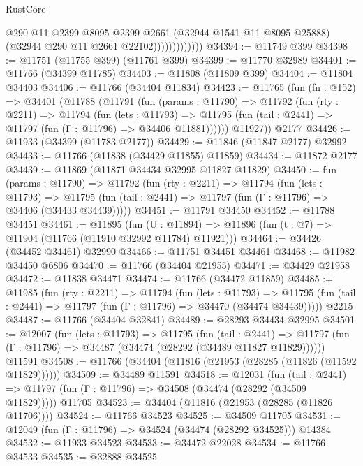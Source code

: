 \begin{lexlean}{RustCore}
\begin{coremodule}
                            @290
                            @11
                            @2399
                            @8095
                            @2399
                            @2661
                            (@32944 @1541 @11 @8095 @25888)
                            (@32944 @290 @11 @2661 @22102)))))))))))))
@34394 := @11749 @399
@34398 := @11751 (@11755 @399) (@11761 @399)
@34399 := @11770 @32989
@34401 := @11766 (@34399 @11785)
@34403 := @11808 (@11809 @399)
@34404 := @11804 @34403
@34406 := @11766 (@34404 @11834)
@34423 := @11765
    (fun (fn : @152) =>
    @34401
      (@11788
        (@11791
          (fun (params : @11790) =>
          @11792
            (fun (rty : @2211) =>
            @11794
              (fun (lets : @11793) =>
              @11795 (fun (tail : @2441) => @11797 (fun (Γ : @11796) => @34406 @11881))))))
        @11927))
    @2177
@34426 := @11933 (@34399 (@11783 @2177))
@34429 := @11846 (@11847 @2177) @32992
@34433 := @11766 (@11838 (@34429 @11855) @11859)
@34434 := @11872 @2177
@34439 := @11869 (@11871 @34434 @32995 @11827 @11829)
@34450 := fun (params : @11790) =>
  @11792
    (fun (rty : @2211) =>
    @11794
      (fun (lets : @11793) =>
      @11795 (fun (tail : @2441) => @11797 (fun (Γ : @11796) => @34406 (@34433 @34439)))))
@34451 := @11791 @34450
@34452 := @11788 @34451
@34461 := @11895
    (fun (U : @11894) => @11896 (fun (t : @7) => @11904 (@11766 (@11910 @32992 @11784) @11921)))
@34464 := @34426 (@34452 @34461) @32990
@34466 := @11751 @34451 @34461
@34468 := @11982 @34450 @6806
@34470 := @11766 (@34404 @21955)
@34471 := @34429 @21958
@34472 := @11838 @34471
@34474 := @11766 (@34472 @11859)
@34485 := @11985
    (fun (rty : @2211) =>
    @11794
      (fun (lets : @11793) =>
      @11795 (fun (tail : @2441) => @11797 (fun (Γ : @11796) => @34470 (@34474 @34439)))))
    @2215
@34487 := @11766 (@34404 @32841)
@34489 := @28293 @34434 @32995
@34501 := @12007
    (fun (lets : @11793) =>
    @11795
      (fun (tail : @2441) =>
      @11797 (fun (Γ : @11796) => @34487 (@34474 (@28292 (@34489 @11827 @11829))))))
    @11591
@34508 := @11766 (@34404 (@11816 (@21953 (@28285 (@11826 (@11592 @11829))))))
@34509 := @34489 @11591
@34518 := @12031
    (fun (tail : @2441) => @11797 (fun (Γ : @11796) => @34508 (@34474 (@28292 (@34509 @11829)))))
    @11705
@34523 := @34404 (@11816 (@21953 (@28285 (@11826 @11706))))
@34524 := @11766 @34523
@34525 := @34509 @11705
@34531 := @12049 (fun (Γ : @11796) => @34524 (@34474 (@28292 @34525))) @14384
@34532 := @11933 @34523
@34533 := @34472 @22028
@34534 := @11766 @34533
@34535 := @32888 @34525

\end{coremodule}
\end{lexlean}
